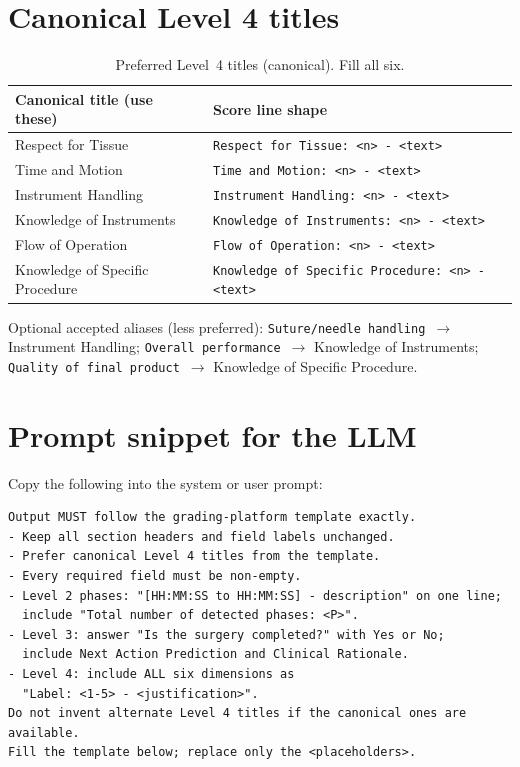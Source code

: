 \documentclass[11pt,a4paper]{article}
\begin{document}
\section{Canonical Level 4 titles}
\label{sec:l4}

\begin{table}[ht]
\centering
\caption{Preferred Level~4 titles (canonical). Fill all six.}
\label{tab:l4}
\begin{tabular}{@{}ll@{}}
\toprule
\textbf{Canonical title (use these)} & \textbf{Score line shape} \\
\midrule
Respect for Tissue &
  \texttt{Respect for Tissue: <n> - <text>} \\
Time and Motion &
  \texttt{Time and Motion: <n> - <text>} \\
Instrument Handling &
  \texttt{Instrument Handling: <n> - <text>} \\
Knowledge of Instruments &
  \texttt{Knowledge of Instruments: <n> - <text>} \\
Flow of Operation &
  \texttt{Flow of Operation: <n> - <text>} \\
Knowledge of Specific Procedure &
  \texttt{Knowledge of Specific Procedure: <n> - <text>} \\
\bottomrule
\end{tabular}
\end{table}

\noindent
Optional accepted aliases (less preferred):
\texttt{Suture/needle handling}~$\to$ Instrument Handling;
\texttt{Overall performance}~$\to$ Knowledge of Instruments;
\texttt{Quality of final product}~$\to$ Knowledge of Specific Procedure.

\section{Prompt snippet for the LLM}
\label{sec:prompt}

Copy the following into the system or user prompt:

\begin{lstlisting}[style=aiout]
Output MUST follow the grading-platform template exactly.
- Keep all section headers and field labels unchanged.
- Prefer canonical Level 4 titles from the template.
- Every required field must be non-empty.
- Level 2 phases: "[HH:MM:SS to HH:MM:SS] - description" on one line;
  include "Total number of detected phases: <P>".
- Level 3: answer "Is the surgery completed?" with Yes or No;
  include Next Action Prediction and Clinical Rationale.
- Level 4: include ALL six dimensions as
  "Label: <1-5> - <justification>".
Do not invent alternate Level 4 titles if the canonical ones are available.
Fill the template below; replace only the <placeholders>.
\end{lstlisting}
\end{document}
